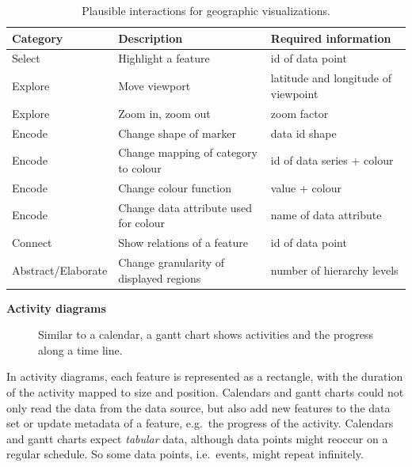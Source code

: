 \begin{table}[H]
  \begin{tabular*}{\textwidth}{lll}
    \bf Category & \bf Description & \bf Required information \\
    \hline
    Select & Highlight a feature & id of data point \\
    Explore & Move viewport & latitude and longitude of viewpoint \\
    Explore & Zoom in, zoom out & zoom factor \\
    Encode & Change shape of marker & data id  shape \\
    Encode & Change mapping of category to colour & id of data series + colour \\
    Encode & Change colour function & value + colour \\
    Encode & Change data attribute used for colour & name of data attribute \\
    Connect & Show relations of a feature & id of data point  \\
    Abstract/Elaborate & Change granularity of displayed regions & number of hierarchy levels \\
  \end{tabular*}
  \caption{Plausible interactions for geographic visualizations.}%
  \label{tab:analysis:geographical:interactions}
\end{table}

\textbf{Activity diagrams}
\begin{figure}
  \centering
  \caption{Similar to a calendar, a gantt chart shows activities and the progress along a time line.}%
  \label{fig:analysis:temporal}
  \qquad
\end{figure}

In activity diagrams, each feature is represented as a rectangle, with the duration of the activity mapped to size and position.
Calendars and gantt charts could not only read the data from the data source, but also add new features to the data set or update metadata of a feature, e.g.\ the progress of the activity.
Calendars and gantt charts expect \emph{tabular} data, although data points might reoccur on a regular schedule.
So some data points, i.e.\ events, might repeat infinitely.

